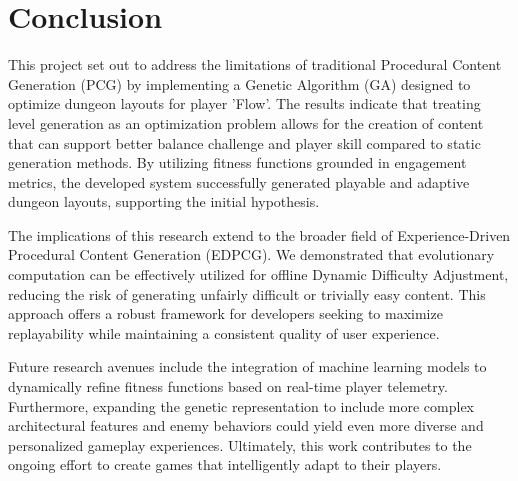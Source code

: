\section{Conclusion}

This project set out to address the limitations of traditional Procedural Content Generation (PCG) by implementing a Genetic Algorithm (GA) designed 
to optimize dungeon layouts for player 'Flow'. The results indicate that treating level generation as an optimization problem allows for the 
creation of content that can support better balance challenge and player skill compared to static generation methods. By utilizing fitness 
functions grounded in engagement metrics, the developed system successfully generated playable and adaptive dungeon layouts, supporting the 
initial hypothesis.

The implications of this research extend to the broader field of Experience-Driven Procedural Content Generation (EDPCG). We demonstrated that 
evolutionary computation can be effectively utilized for offline Dynamic Difficulty Adjustment, reducing the risk of generating unfairly difficult 
or trivially easy content. This approach offers a robust framework for developers seeking to maximize replayability while maintaining a consistent 
quality of user experience.

Future research avenues include the integration of machine learning models to dynamically refine fitness functions based on real-time player 
telemetry. Furthermore, expanding the genetic representation to include more complex architectural features and enemy behaviors could yield 
even more diverse and personalized gameplay experiences. Ultimately, this work contributes to the ongoing effort to create games that intelligently 
adapt to their players.
